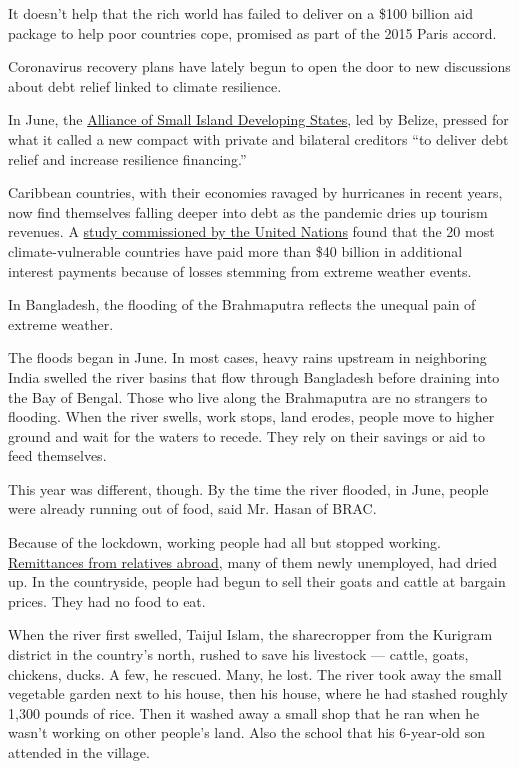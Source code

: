 It doesn't help that the rich world has failed to deliver on a \$100
billion aid package to help poor countries cope, promised as part of the
2015 Paris accord.

Coronavirus recovery plans have lately begun to open the door to new
discussions about debt relief linked to climate resilience.

In June, the
\href{https://www.aosis.org/wp-content/uploads/2020/07/AOSIS-Statement-on-Debt_verJune-29.pdf}{Alliance
of Small Island Developing States}, led by Belize, pressed for what it
called a new compact with private and bilateral creditors ``to deliver
debt relief and increase resilience financing.''

Caribbean countries, with their economies ravaged by hurricanes in
recent years, now find themselves falling deeper into debt as the
pandemic dries up tourism revenues. A
\href{https://unfccc.int/news/climate-change-is-driving-debt-for-developing-countries}{study
commissioned by the United Nations} found that the 20 most
climate-vulnerable countries have paid more than \$40 billion in
additional interest payments because of losses stemming from extreme
weather events.

In Bangladesh, the flooding of the Brahmaputra reflects the unequal pain
of extreme weather.

The floods began in June. In most cases, heavy rains upstream in
neighboring India swelled the river basins that flow through Bangladesh
before draining into the Bay of Bengal. Those who live along the
Brahmaputra are no strangers to flooding. When the river swells, work
stops, land erodes, people move to higher ground and wait for the waters
to recede. They rely on their savings or aid to feed themselves.

This year was different, though. By the time the river flooded, in June,
people were already running out of food, said Mr. Hasan of BRAC.

Because of the lockdown, working people had all but stopped working.
\href{https://www.nytimes3xbfgragh.onion/2020/07/27/business/global-remittances-coronavirus.html}{Remittances
from relatives abroad}, many of them newly unemployed, had dried up. In
the countryside, people had begun to sell their goats and cattle at
bargain prices. They had no food to eat.

When the river first swelled, Taijul Islam, the sharecropper from the
Kurigram district in the country's north, rushed to save his livestock
--- cattle, goats, chickens, ducks. A few, he rescued. Many, he lost.
The river took away the small vegetable garden next to his house, then
his house, where he had stashed roughly 1,300 pounds of rice. Then it
washed away a small shop that he ran when he wasn't working on other
people's land. Also the school that his 6-year-old son attended in the
village.

